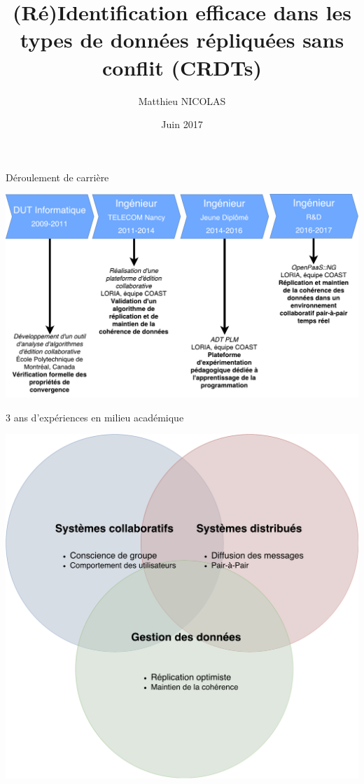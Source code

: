 \documentclass[10pt]{beamer}
\author{Matthieu NICOLAS}
\title{(Ré)Identification efficace dans les types de données répliquées sans conflit (CRDTs)}
\date{Juin 2017}
\begin{document}
\begin{frame}[t,plain]
\titlepage
\end{frame}

\begin{frame}{Déroulement de carrière}
  \begin{center}
    \includegraphics[scale=0.35]{fig/frise.pdf}
  \end{center}
\end{frame}

\begin{frame}{3 ans d'expériences en milieu académique}
  \begin{center}
    \includegraphics[scale=0.25]{fig/patates.pdf}
  \end{center}
\end{frame}
\end{document}
